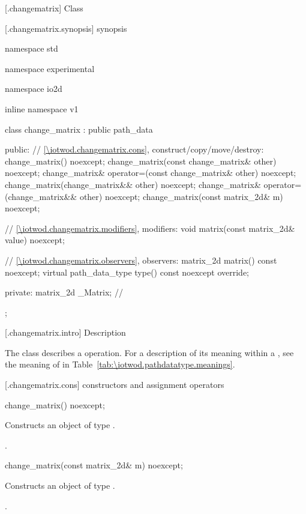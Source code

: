  [\iotwod.changematrix] {Class }

 [\iotwod.changematrix.synopsis] { synopsis}

\begin{codeblock}
namespace std { namespace experimental { namespace io2d { inline namespace v1 {
  class change_matrix : public path_data {
  public:
    // \ref{\iotwod.changematrix.cons}, construct/copy/move/destroy:
    change_matrix() noexcept;
    change_matrix(const change_matrix& other) noexcept;
    change_matrix& operator=(const change_matrix& other) noexcept;
    change_matrix(change_matrix&& other) noexcept;
    change_matrix& operator=(change_matrix&& other) noexcept;
    change_matrix(const matrix_2d& m) noexcept;

    // \ref{\iotwod.changematrix.modifiers}, modifiers:
    void matrix(const matrix_2d& value) noexcept;

    // \ref{\iotwod.changematrix.observers}, observers:
    matrix_2d matrix() const noexcept;
    virtual path_data_type type() const noexcept override;
    
  private:
    matrix_2d _Matrix; // \expos
  };
} } } }
\end{codeblock}

 [\iotwod.changematrix.intro] { Description}

\pnum
{}
The class  describes a  operation. For a description of its meaning within a , see the meaning of  in Table~\ref{tab:\iotwod.pathdatatype.meanings}.

 [\iotwod.changematrix.cons] { constructors and assignment operators}

\begin{itemdecl}
    change_matrix() noexcept;
\end{itemdecl}
\begin{itemdescr}
	\pnum
	\effects
	Constructs an object of type .
	
	\pnum
	\postconditions
	.
\end{itemdescr}

\begin{itemdecl}
    change_matrix(const matrix_2d& m) noexcept;
\end{itemdecl}
\begin{itemdescr}
	\pnum
	\effects
	Constructs an object of type .
	
	\pnum
	\postconditions
	.
\end{itemdescr}

